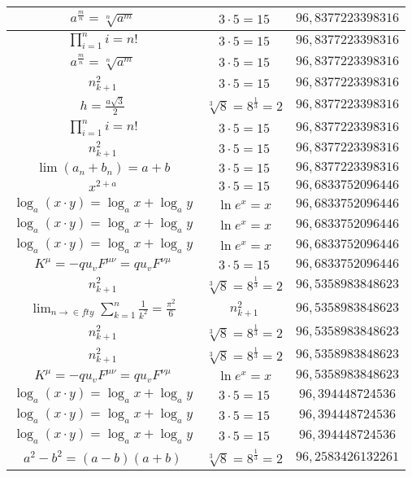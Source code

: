 \documentclass{article}
\begin{document}
\begin{flushleft}
\begin{longtable}{|c|c|c|}
$a^{\frac{m}{n}}=\sqrt[n]{a^{m}}$ & $3\cdot 5=15$ & $96,8377223398316$ \\ \hline 
$\prod_{i=1}^ni=n!$ & $3\cdot 5=15$ & $96,8377223398316$ \\ \hline 
$a^{\frac{m}{n}}=\sqrt[n]{a^{m}}$ & $3\cdot 5=15$ & $96,8377223398316$ \\ \hline 
$n_{k+1}^2$ & $3\cdot 5=15$ & $96,8377223398316$ \\ \hline 
$h=\frac{a\sqrt{3}}{2}$ & $\sqrt[3]{8}=8^{\frac{1}{3}}=2$ & $96,8377223398316$ \\ \hline 
$\prod_{i=1}^ni=n!$ & $3\cdot 5=15$ & $96,8377223398316$ \\ \hline 
$n_{k+1}^2$ & $3\cdot 5=15$ & $96,8377223398316$ \\ \hline 
$\lim\left(a_n+b_n\right)=a+b$ & $3\cdot 5=15$ & $96,8377223398316$ \\ \hline 
$x^{2+a}$ & $3\cdot 5=15$ & $96,6833752096446$ \\ \hline 
$\log_{a}(x\cdot y)=\log_{a}x+\log_{a}y$ & $\ln e^x=x$ & $96,6833752096446$ \\ \hline 
$\log_{a}(x\cdot y)=\log_{a}x+\log_{a}y$ & $\ln e^x=x$ & $96,6833752096446$ \\ \hline 
$\log_{a}(x\cdot y)=\log_{a}x+\log_{a}y$ & $\ln e^x=x$ & $96,6833752096446$ \\ \hline 
$K^\mu=-qu_vF^{\mu\nu}=qu_vF^{\nu\mu}$ & $3\cdot 5=15$ & $96,6833752096446$ \\ \hline 
$n_{k+1}^2$ & $\sqrt[3]{8}=8^{\frac{1}{3}}=2$ & $96,5358983848623$ \\ \hline 
$\lim_{n\to\in fty}\sum_{k=1}^n\frac{1}{k^2}=\frac{\pi^2}{6}$ & $n_{k+1}^2$ & $96,5358983848623$ \\ \hline 
$n_{k+1}^2$ & $\sqrt[3]{8}=8^{\frac{1}{3}}=2$ & $96,5358983848623$ \\ \hline 
$n_{k+1}^2$ & $\sqrt[3]{8}=8^{\frac{1}{3}}=2$ & $96,5358983848623$ \\ \hline 
$K^\mu=-qu_vF^{\mu\nu}=qu_vF^{\nu\mu}$ & $\ln e^x=x$ & $96,5358983848623$ \\ \hline 
$\log_{a}(x\cdot y)=\log_{a}x+\log_{a}y$ & $3\cdot 5=15$ & $96,394448724536$ \\ \hline 
$\log_{a}(x\cdot y)=\log_{a}x+\log_{a}y$ & $3\cdot 5=15$ & $96,394448724536$ \\ \hline 
$\log_{a}(x\cdot y)=\log_{a}x+\log_{a}y$ & $3\cdot 5=15$ & $96,394448724536$ \\ \hline 
$a^2-b^2=(a-b)(a+b)$ & $\sqrt[3]{8}=8^{\frac{1}{3}}=2$ & $96,2583426132261$ \\ \hline 

\end{longtable}
\end{flushleft}
\end{document}
